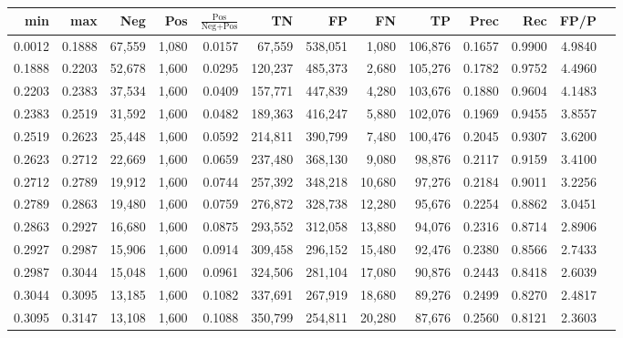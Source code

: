 \begin{tabular}{rrrrrrrrrrrrr}
\toprule
   min &    max &    Neg &   Pos & $\frac{\text{Pos}}{\text{Neg}+\text{Pos}}$ &      TN &      FP &      FN &      TP &   Prec &    Rec &   FP/P \\
\midrule
0.0012 & 0.1888 & 67,559 & 1,080 &                                     0.0157 &  67,559 & 538,051 &   1,080 & 106,876 & 0.1657 & 0.9900 & 4.9840 \\
0.1888 & 0.2203 & 52,678 & 1,600 &                                     0.0295 & 120,237 & 485,373 &   2,680 & 105,276 & 0.1782 & 0.9752 & 4.4960 \\
0.2203 & 0.2383 & 37,534 & 1,600 &                                     0.0409 & 157,771 & 447,839 &   4,280 & 103,676 & 0.1880 & 0.9604 & 4.1483 \\
0.2383 & 0.2519 & 31,592 & 1,600 &                                     0.0482 & 189,363 & 416,247 &   5,880 & 102,076 & 0.1969 & 0.9455 & 3.8557 \\
0.2519 & 0.2623 & 25,448 & 1,600 &                                     0.0592 & 214,811 & 390,799 &   7,480 & 100,476 & 0.2045 & 0.9307 & 3.6200 \\
0.2623 & 0.2712 & 22,669 & 1,600 &                                     0.0659 & 237,480 & 368,130 &   9,080 &  98,876 & 0.2117 & 0.9159 & 3.4100 \\
0.2712 & 0.2789 & 19,912 & 1,600 &                                     0.0744 & 257,392 & 348,218 &  10,680 &  97,276 & 0.2184 & 0.9011 & 3.2256 \\
0.2789 & 0.2863 & 19,480 & 1,600 &                                     0.0759 & 276,872 & 328,738 &  12,280 &  95,676 & 0.2254 & 0.8862 & 3.0451 \\
0.2863 & 0.2927 & 16,680 & 1,600 &                                     0.0875 & 293,552 & 312,058 &  13,880 &  94,076 & 0.2316 & 0.8714 & 2.8906 \\
0.2927 & 0.2987 & 15,906 & 1,600 &                                     0.0914 & 309,458 & 296,152 &  15,480 &  92,476 & 0.2380 & 0.8566 & 2.7433 \\
0.2987 & 0.3044 & 15,048 & 1,600 &                                     0.0961 & 324,506 & 281,104 &  17,080 &  90,876 & 0.2443 & 0.8418 & 2.6039 \\
0.3044 & 0.3095 & 13,185 & 1,600 &                                     0.1082 & 337,691 & 267,919 &  18,680 &  89,276 & 0.2499 & 0.8270 & 2.4817 \\
0.3095 & 0.3147 & 13,108 & 1,600 &                                     0.1088 & 350,799 & 254,811 &  20,280 &  87,676 & 0.2560 & 0.8121 & 2.3603 \\

\end{tabular}
